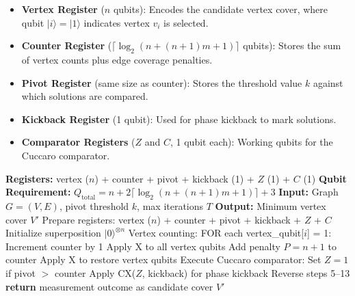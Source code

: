 \documentclass{ieeeaccess}
\begin{document}
\begin{itemize}
    \item \textbf{Vertex Register} ($n$ qubits): Encodes the
    candidate vertex cover, where qubit $|i\rangle = |1\rangle$
    indicates vertex $v_i$ is selected.

    \item \textbf{Counter Register}
    ($\lceil\log_2(n + (n+1)m + 1)\rceil$ qubits): Stores
    the sum of vertex counts plus edge coverage penalties.

    \item \textbf{Pivot Register} (same size as counter):
    Stores the threshold value $k$ against which solutions
    are compared.

    \item \textbf{Kickback Register} (1 qubit): Used for
    phase kickback to mark solutions.

    \item \textbf{Comparator Registers} ($Z$ and $C$, 1 qubit
    each): Working qubits for the Cuccaro comparator.
\end{itemize}

\begin{algorithm}[htbp]
\caption{Arithmetic-Based Architecture}
\label{algo:arithmetic}
\begin{algorithmic}[1]
\STATE \textbf{Registers:} vertex ($n$) + counter + pivot +
kickback (1) + $Z$ (1) + $C$ (1)
\STATE \textbf{Qubit Requirement:}
$Q_{\mathrm{total}} = n + 2\lceil\log_2(n + (n+1)m + 1)\rceil + 3$
\STATE \textbf{Input:} Graph $G=(V,E)$, pivot threshold $k$,
max iterations $T$
\STATE \textbf{Output:} Minimum vertex cover $V'$
\STATE Prepare registers: vertex ($n$) + counter + pivot +
kickback + $Z$ + $C$
\STATE Initialize superposition $|0\rangle^{\otimes n}$
    \STATE {}
    \STATE Vertex counting: FOR each vertex\_qubit[$i$] = 1:
    \STATE \hspace{1em} Increment counter by 1
    \STATE Apply X to all vertex qubits
            \STATE Add penalty $P = n+1$ to counter
        \ENDIF
    \ENDFOR
    \STATE Apply X to restore vertex qubits
    \STATE Execute Cuccaro comparator: Set $Z = 1$ if
    pivot $>$ counter
    \STATE Apply CX($Z$, kickback) for phase kickback
    \STATE {}
    \STATE Reverse steps 5--13
    \STATE {}
\ENDFOR
\STATE \textbf{return} measurement outcome as candidate
cover $V'$
\end{algorithmic}
\end{algorithm}
\end{document}
